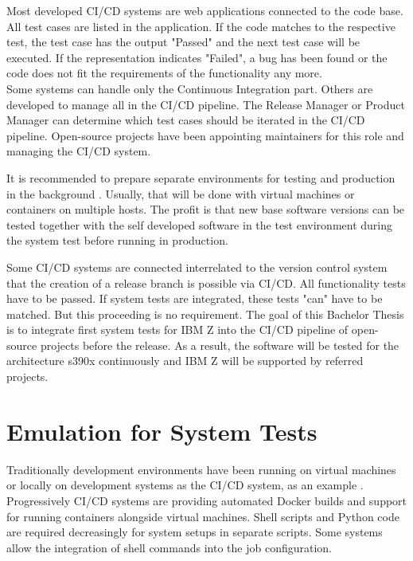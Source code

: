 Most developed \gls{CI/CD} systems are web applications connected to the code base. All test cases are listed in the application. If the code matches to the respective test, the test case has the output "Passed" and the next test case will be executed. If the representation indicates "Failed", a bug has been found or the code does not fit the requirements of the functionality any more. \\
Some systems can handle only the Continuous Integration part. Others are developed to manage all in the \gls{CI/CD} pipeline.
The Release Manager or Product Manager can determine which test cases should be iterated in the \gls{CI/CD} pipeline. Open-source projects have been appointing maintainers for this role and managing the \gls{CI/CD} system.

It is recommended to prepare separate environments for testing and production in the background \cite[~p.120]{Scholl2019}. 
Usually, that will be done with virtual machines or containers on multiple hosts. The profit is that new base software versions can be tested together with the self developed software in the test environment during the system test before running in production.

Some \gls{CI/CD} systems are connected interrelated to the version control system that the creation of a release branch is possible via \gls{CI/CD}. All functionality tests have to be passed.  If system tests are integrated, these tests "can" have to be matched. But this proceeding is no requirement. The goal of this Bachelor Thesis is to integrate first system tests for IBM Z into the \gls{CI/CD} pipeline of open-source projects before the release. As a result, the software will be tested for the architecture s390x continuously and IBM Z will be supported by referred projects.

\section{Emulation for System Tests}

Traditionally development environments have been running on virtual machines or locally on development systems as the \gls{CI/CD} system, as an example \cite[~p.123]{Scholl2019}. Progressively \gls{CI/CD} systems are providing automated Docker builds and support for running containers alongside virtual machines. 
Shell scripts and Python code are required decreasingly for system setups in separate scripts. Some systems allow the integration of shell commands into the job configuration.

